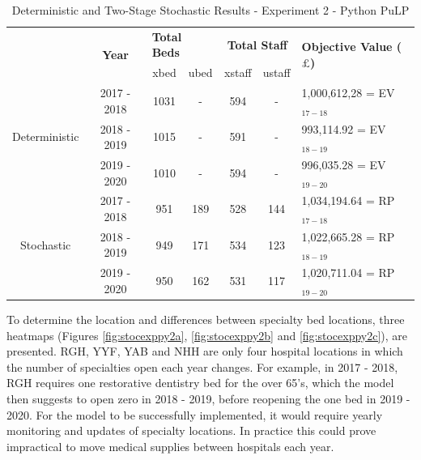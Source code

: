 \documentclass[../thesis.tex]{subfiles}
\begin{document}
\begin{table}[h!]
    \centering
    \begin{tabular}{ccccccl}\toprule
 & \multirow{2}{*}{\textbf{Year}}& \multicolumn{2}{l}{\textbf{Total Beds}} & \multicolumn{2}{c}{\textbf{Total Staff}} & \multirow{2}{*}{\textbf{Objective Value ($\pounds$)}}\\ \cmidrule(lr){3-4} \cmidrule(lr){5-6}
&& xbed           & ubed          & xstaff         & ustaff         \\ \midrule
     \multirow{3}{*}{Deterministic} & 2017 - 2018 & 1031 & - &  594 & - & 1,000,612,28 =  EV$_{17-18}$ \\ 
      & 2018 - 2019 & 1015 & - & 591 & - & 993,114.92 =  EV$_{18-19}$ \\
      & 2019 - 2020 & 1010 & - & 594 & - & 996,035.28 =  EV$_{19-20}$\\\midrule
     \multirow{3}{*}{Stochastic} & 2017 - 2018 & 951 & 189 & 528 & 144 & 1,034,194.64 =  RP$_{17-18}$ \\ 
      & 2018 - 2019 & 949 & 171 & 534 & 123 & 1,022,665.28 =  RP$_{18-19}$ \\
      & 2019 - 2020 & 950 & 162 & 531 & 117 & 1,020,711.04 =  RP$_{19-20}$\\ \bottomrule      
    \end{tabular}
    \caption{Deterministic and Two-Stage Stochastic Results - Experiment 2 - Python PuLP}
    \label{tab:detstocresultspy2}
\end{table}

To determine the location and differences between specialty bed locations, three heatmaps (Figures \ref{fig:stocexppy2a}, \ref{fig:stocexppy2b} and \ref{fig:stocexppy2c}), are presented. RGH, YYF, YAB and NHH are only four hospital locations in which the number of specialties open each year changes. For example, in 2017 - 2018, RGH requires one restorative dentistry bed for the over 65's, which the model then suggests to open zero in 2018 - 2019, before reopening the one bed in 2019 - 2020.  For the model to be successfully implemented, it would require yearly monitoring and updates of specialty locations. In practice this could prove impractical to move medical supplies between hospitals each year.
\end{document}
